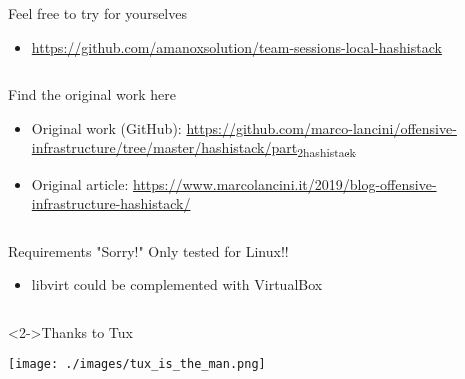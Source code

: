 \documentclass[presentation]{beamer}
\begin{document}
\begin{frame}[label={sec:org239bbf6}]{Feel free to try for yourselves}
\begin{itemize}
\item \href{https://github.com/amanoxsolution/team-sessions-local-hashistack}{https://github.com/amanoxsolution/team-sessions-local-hashistack}
\end{itemize}
\begin{columns}
\begin{column}{0.85\columnwidth}
\begin{block}{Find the original work here}
\begin{itemize}
\item Original work (GitHub): \href{https://github.com/marco-lancini/offensive-infrastructure/tree/master/hashistack/part\_2\_hashistack}{https://github.com/marco-lancini/offensive-infrastructure/tree/master/hashistack/part\textsubscript{2}\textsubscript{hashistack}}
\item Original article: \href{https://www.marcolancini.it/2019/blog-offensive-infrastructure-hashistack/}{https://www.marcolancini.it/2019/blog-offensive-infrastructure-hashistack/}
\end{itemize}
\end{block}
\end{column}
\end{columns}
\end{frame}

\begin{frame}[label={sec:orgef89989}]{Requirements}
"Sorry!" Only tested for Linux!!
\begin{itemize}
\item libvirt could be complemented with VirtualBox
\end{itemize}

\begin{columns}
\begin{column}{0.48\columnwidth}
\begin{block}<2->{Thanks to Tux}
\begin{center}
\texttt{[image: ./images/tux\_is\_the\_man.png]}
\end{center}
\end{block}
\end{column}
\end{columns}
\end{frame}
\end{document}
